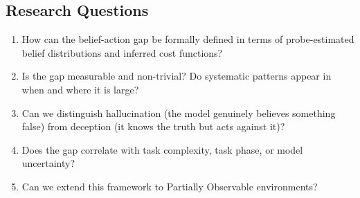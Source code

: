 \documentclass[final]{sparreport}
\newcommand{\ra}[1]{\textcolor{blue}{#1}}
\begin{document}
\subsection*{Research Questions}
\begin{enumerate}
  \item How can the belief-action gap be formally defined in terms of
        probe-estimated belief distributions and inferred cost functions?
  \item Is the gap measurable and non-trivial? Do systematic patterns
        appear in when and where it is large?
  \item Can we distinguish hallucination (the model genuinely believes something false) from deception (it knows the truth but acts against it)?
  \item Does the gap correlate with task complexity, task phase, or model uncertainty?
  \item Can we extend this framework to Partially Observable environments?
\end{enumerate}
\end{document}

